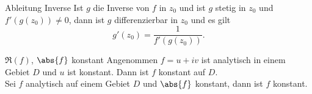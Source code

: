 \begin{karte}{Ableitung Inverse}
    Ist \(g\) die Inverse von \(f\) in \(z_0\) und ist \(g\) stetig in \(z_0\) 
    und \(f'(g(z_0)) \neq 0\), dann ist \(g\) differenzierbar in \(z_0\) und es gilt 
    \[ g'(z_0) = \frac{1}{f'(g(z_0))}. \]
\end{karte}

\begin{karte}{\(\Re(f)\), \(\abs{f}\) konstant}
    Angenommen \(f=u+iv\) ist analytisch in einem Gebiet \(D\) und \(u\) ist konstant. 
    Dann ist \(f\) konstant auf \(D\).\\
    Sei \(f\) analytisch auf einem Gebiet \(D\) und \(\abs{f}\) konstant, dann ist \(f\) konstant.
\end{karte}